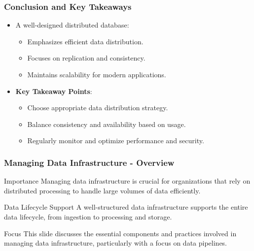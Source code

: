 \documentclass[aspectratio=169]{beamer}
\begin{document}
\begin{frame}[fragile]
    \frametitle{Conclusion and Key Takeaways}
    \begin{itemize}
        \item A well-designed distributed database:
            \begin{itemize}
                \item Emphasizes efficient data distribution.
                \item Focuses on replication and consistency.
                \item Maintains scalability for modern applications.
            \end{itemize}
        \item \textbf{Key Takeaway Points}:
            \begin{itemize}
                \item Choose appropriate data distribution strategy.
                \item Balance consistency and availability based on usage.
                \item Regularly monitor and optimize performance and security.
            \end{itemize}
    \end{itemize}
\end{frame}

\begin{frame}[fragile]
    \frametitle{Managing Data Infrastructure - Overview}
    \begin{block}{Importance}
        Managing data infrastructure is crucial for organizations that rely on distributed processing to handle large volumes of data efficiently. 
    \end{block}
    \begin{block}{Data Lifecycle Support}
        A well-structured data infrastructure supports the entire data lifecycle, from ingestion to processing and storage.
    \end{block}
    \begin{block}{Focus}
        This slide discusses the essential components and practices involved in managing data infrastructure, particularly with a focus on data pipelines.
    \end{block}
\end{frame}
\end{document}
